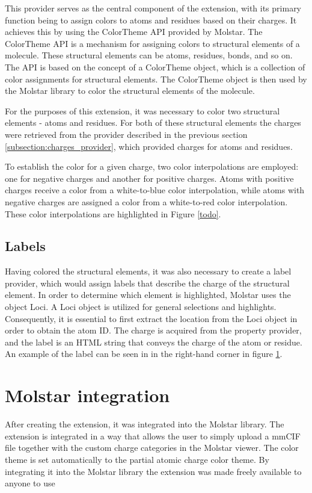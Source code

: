 \documentclass[
  digital,     %
  oneside,     %
  nosansbold,  %
  nocolorbold, %
  lof,         %
  lot,         %
]{fithesis4}
\begin{document}
This provider serves as the central component of the extension, with its primary function being to assign colors to atoms and residues based on their charges. It achieves this by using the ColorTheme API provided by Molstar. The ColorTheme API is a mechanism for assigning colors to structural elements of a molecule. These structural elements can be atoms, residues, bonds, and so on. The API is based on the concept of a ColorTheme object, which is a collection of color assignments for structural elements. The ColorTheme object is then used by the Molstar library to color the structural elements of the molecule.

For the purposes of this extension, it was necessary to color two structural elements - atoms and residues. For both of these structural elements the charges were retrieved from the provider described in the previous section \ref{subsection:charges_provider}, which provided charges for atoms and residues.

To establish the color for a given charge, two color interpolations are employed: one for negative charges and another for positive charges. Atoms with positive charges receive a color from a white-to-blue color interpolation, while atoms with negative charges are assigned a color from a white-to-red color interpolation. These color interpolations are highlighted in Figure \ref{todo}. 

\subsection{Labels}
\label{subsection:labels}

Having colored the structural elements, it was also necessary to create a label provider, which would assign labels that describe the charge of the structural element. In order to determine which element is highlighted, Molstar uses the object Loci. A Loci object is utilized for general selections and highlights. Consequently, it is essential to first extract the location from the Loci object in order to obtain the atom ID. The charge is acquired from the property provider, and the label is an HTML string that conveys the charge of the atom or residue. An example of the label can be seen in in the right-hand corner in figure \ref{}.

\section{Molstar integration}

After creating the extension, it was integrated into the Molstar library. The extension is integrated in a way that allows the user to simply upload a mmCIF file together with the custom charge categories in the Molstar viewer. The color theme is set automatically to the partial atomic charge color theme. By integrating it into the Molstar library the extension was made freely available to anyone to use
\end{document}
